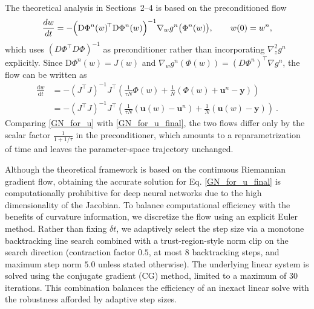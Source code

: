 \documentclass[twoside,11pt]{article}
\newcommand{\dd}{\mathrm{d}}
\begin{document}
\begin{remark}
The theoretical analysis in Sections~2--4 is based on the
preconditioned flow
\begin{equation*}
    \frac{dw}{dt}
    =
    -
    \Bigl(
        \mathrm{D}\Phi^n(w)^{\!\top}
        \mathrm{D}\Phi^n(w)
    \Bigr)^{-1} \nabla_{w} g^n\bigl(\Phi^n(w)\bigr),
    \qquad
    w(0) = w^n,
\end{equation*}
which uses $(D\Phi^\top D\Phi)^{-1}$ as preconditioner rather than
incorporating $\nabla^2_z g^n$ explicitly.
Since $\mathrm{D}\Phi^n(w) = J (w)$ and
$\nabla_{w} g^n(\Phi(w)) =  (D \Phi^n)^{\!\top} \nabla g^n$,
the flow can be written as
\begin{equation}\label{GN_for_u}
\begin{aligned}
\frac{\dd w}{\dd t} & = - (J^{\!\top} J)^{-1}  J^{\!\top} \left( \frac{1}{\tau  N} \Phi(w) + \frac{1}{N}  \left( \Phi(w) + {\bm u}^n - {\bm y} \right) \right) \\
& = - ( J^{\!\top} J)^{-1}  J^{\!\top} \left( \frac{1}{\tau N} ({\bm u}(w) - {\bm u}^n) + \frac{1}{N}  \left( {\bm u}(w) - {\bm y} \right) \right)\ .
\end{aligned}
\end{equation}
Comparing \eqref{GN_for_u} with \eqref{GN_for_u_final}, the two
flows differ only by the scalar factor
$\frac{1}{1+1/\tau}$ in the preconditioner, which amounts to a reparametrization of time and leaves the parameter-space trajectory unchanged.
\end{remark}

Although the theoretical framework is based on the continuous Riemannian gradient flow, obtaining the accurate solution for Eq. \eqref{GN_for_u_final} is computationally prohibitive for deep neural networks due to the high dimensionality of the Jacobian. To balance computational efficiency with the benefits of curvature information, we discretize the flow using an explicit Euler method. Rather than fixing $\delta t$, we adaptively select the step size via a monotone backtracking line search combined with a trust-region-style norm clip on the search direction (contraction factor $0.5$, at most $8$ backtracking steps, and maximum step norm $5.0$ unless stated otherwise). The underlying linear system is solved using the conjugate gradient (CG) method, limited to a maximum of 30 iterations. This combination balances the efficiency of an inexact linear solve with the robustness afforded by adaptive step sizes.
\end{document}

